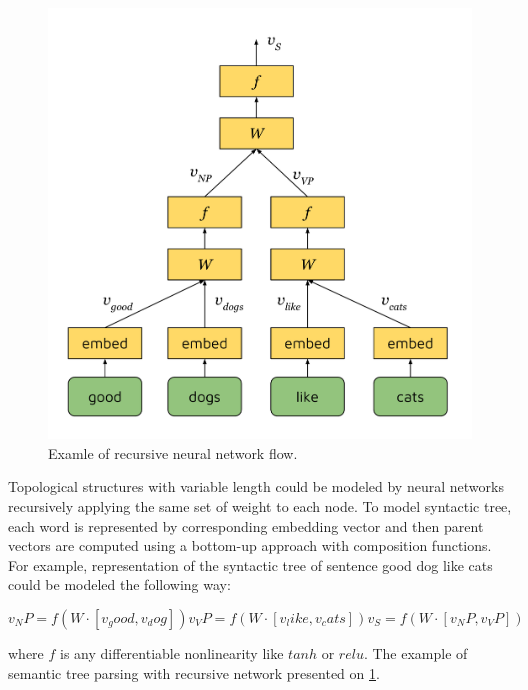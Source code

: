 \begin{figure}
\centering
\includegraphics{Figures/rvnn}
\decoRule
\caption[RvNN flow]{Examle of recursive neural network flow.}
\label{fig:rvnn}
\end{figure}

Topological structures with variable length could be modeled by neural networks recursively applying the same set of weight to each node. To model syntactic tree, each word is represented by corresponding embedding vector and then parent vectors are computed using a bottom-up approach with composition functions. For example, representation of the syntactic tree of sentence good dog like cats could be modeled the following way:

\begin{equation}
v_NP = f(W\cdot[v_good, v_dog])
v_VP = f(W\cdot[v_like, v_cats])
v_S = f(W\cdot[v_NP, v_VP])
\label{attn:rvnn_example}
\end{equation}

where $f$ is any differentiable nonlinearity like $tanh$ or $relu$. The example of semantic tree parsing with recursive network presented on \ref{fig:rvnn}. 

 